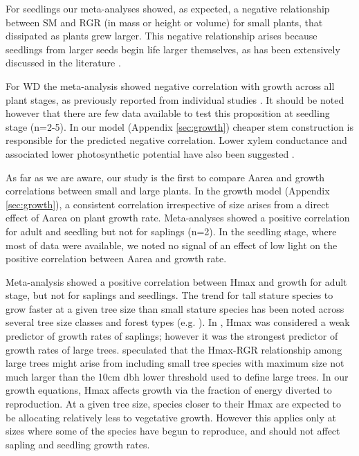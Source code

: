 \documentclass[a4paper,11pt]{article}
\begin{document}
For seedlings our meta-analyses showed, as expected, a negative relationship between SM and RGR (in mass or height or volume) for small plants, that dissipated as plants grew larger. This negative relationship arises because seedlings from larger seeds begin life larger themselves, as has been extensively discussed in the literature \citep[reviewed by][]{Turnbull:2012ew}. 

For WD the meta-analysis showed negative correlation with growth across all plant stages, as previously reported from individual studies \citep{Wright:2010tp,Ruger:2012jv}. It should be noted however that there are few data available to test this proposition at seedling stage (n=2-5). In our model (Appendix \ref{sec:growth}) cheaper stem construction is responsible for the predicted negative correlation. Lower xylem conductance and associated lower photosynthetic potential have also been suggested \citep[reviewed by][]{Chave:2009iy}.

As far as we are aware, our study is the first to compare Aarea and growth correlations between small and large plants. In the growth model (Appendix \ref{sec:growth}), a consistent correlation irrespective of size arises from a direct effect of Aarea on plant growth rate. Meta-analyses showed a positive correlation for adult and seedling but not for saplings (n=2). In the seedling stage, where most of data were available, we noted no signal of an effect of low light on the positive correlation between Aarea and growth rate.

Meta-analysis showed a positive correlation between Hmax and growth for adult stage, but not for saplings and seedlings. The trend for tall stature species to grow faster at a given tree size than small stature species has been noted across several tree size classes and forest types (e.g. \citealt{Thomas:1996do,Poorter:2008iu,Wright:2010tp,Herault:2011dd,Ruger:2012jv,Iida:2014ep}). In \citet{Wright:2010tp}, Hmax was considered a weak predictor of growth rates of saplings; however it was the strongest predictor of growth rates of large trees. \citet{Poorter:2008iu} speculated that the Hmax-RGR relationship among large trees might arise from including small tree species with maximum size not much larger than the 10cm dbh lower threshold used to define large trees. In our growth equations, Hmax affects growth via the fraction of energy diverted to reproduction. At a given tree size, species closer to their Hmax are expected to be allocating relatively less to vegetative growth. However this applies only at sizes where some of the species have begun to reproduce, and should not affect sapling and seedling growth rates.
\end{document}
